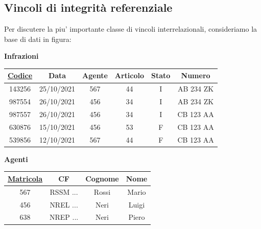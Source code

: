 \documentclass[12pt]{report}
\begin{document}
 	\subsection{Vincoli di integrità referenziale}
 	Per discutere la piu' importante classe di vincoli interrelazionali, consideriamo la base di dati in figura:
 	\begin{center}
 		\textbf{Infrazioni}

 		\vspace{0.3cm}

 		\begin{tabular}{|c|c|c|c|c|c|}
 			\hline
 			\textbf{\underline{Codice}} & \textbf{Data} & \textbf{Agente} & \textbf{Articolo} & \textbf{Stato} & \textbf{Numero} \\
 			\hline
 			143256 & 25/10/2021 & 567 & 44 & I & AB 234 ZK \\
 			987554 & 26/10/2021 & 456 & 34 & I & AB 234 ZK \\
 			987557 & 26/10/2021 & 456 & 34 & I & CB 123 AA \\
 			630876 & 15/10/2021 & 456 & 53 & F & CB 123 AA \\
 			539856 & 12/10/2021 & 567 & 44 & F & CB 123 AA \\
 			\hline
 		\end{tabular}
 	\end{center}

 	\vspace{1cm}

 	\begin{center}
 		\textbf{Agenti}

 		\vspace{0.3cm}

 		\begin{tabular}{|c|c|c|c|}
 			\hline
 			\textbf{\underline{Matricola}} & \textbf{CF} & \textbf{Cognome} & \textbf{Nome} \\
 			\hline
 			567 & RSSM ... & Rossi & Mario \\
 			456 & NREL ... & Neri & Luigi \\
 			638 & NREP ... & Neri & Piero \\
 			\hline
 		\end{tabular}
 	\end{center}

 	\vspace{1cm}
\end{document}
